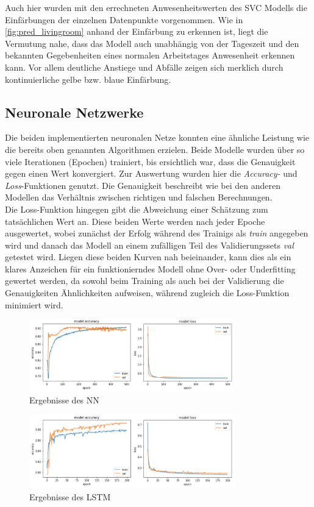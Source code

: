 Auch hier wurden mit den errechneten Anwesenheitswerten des SVC Modells die Einfärbungen der einzelnen Datenpunkte 
vorgenommen. 
Wie in \ref{fig:pred_livingroom} anhand der Einfärbung zu erkennen ist, liegt die Vermutung nahe, dass das Modell 
auch unabhängig von der Tageszeit und den bekannten Gegebenheiten eines normalen Arbeitstages Anwesenheit 
erkennen kann. Vor allem deutliche Anstiege und Abfälle zeigen sich merklich durch kontinuierliche gelbe bzw. 
blaue Einfärbung.

\subsection{Neuronale Netzwerke}
Die beiden implementierten neuronalen Netze konnten eine ähnliche Leistung wie die bereits oben genannten 
Algorithmen erzielen. Beide Modelle wurden über so viele Iterationen (Epochen) trainiert, bis ersichtlich war,
dass die Genauigkeit gegen einen Wert konvergiert. Zur Auswertung wurden hier die \textit{Accuracy-} und 
\textit{Loss}-Funktionen genutzt. Die Genauigkeit beschreibt wie bei den anderen Modellen das Verhältnis
zwischen richtigen und falschen Berechnungen.\\
Die Loss-Funktion hingegen gibt die Abweichung einer Schätzung zum tatsächlichen Wert an. Diese beiden Werte 
werden nach jeder Epoche ausgewertet, wobei zunächst der Erfolg während des Trainigs als \textit{train}
angegeben wird und danach das Modell an einem zufälligen Teil des Validierungssets \textit{val} getestet wird.
Liegen diese beiden Kurven nah beieinander, kann dies als ein klares Anzeichen für ein funktionierndes Modell ohne 
Over- oder Underfitting gewertet werden, da sowohl beim Training als auch bei der Validierung die Genauigkeiten 
Ähnlichkeiten aufweisen, während zugleich die Loss-Funktion minimiert wird.

\begin{figure}[h]
    \centering
    \includegraphics[width=0.8\textwidth]{pic/eval_NN.png}
    \caption{Ergebnisse des NN}
    \label{fig:eval_NN}
\end{figure}

\begin{figure}[h]
    \centering
    \includegraphics[width=0.8\textwidth]{pic/eval_LSTM.png}
    \caption{Ergebnisse des LSTM}
    \label{fig:eval_LSTM}
\end{figure}

